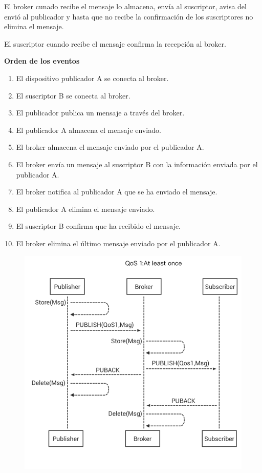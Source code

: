 \documentclass[12pt]{report} %
\begin{document}
\begin{description}
	El broker cunado recibe el mensaje lo almacena, envía al suscriptor, avisa del envió al publicador y hasta que no recibe la confirmación de los suscriptores no elimina el mensaje.

	El suscriptor cuando recibe el mensaje confirma la recepción al broker.

	\textbf{Orden de los eventos}
	\begin{enumerate}
	\item El dispositivo publicador A se conecta al broker.
	\item El suscriptor B se conecta al broker.
	\item El publicador publica un mensaje a través del broker.
	\item El publicador A almacena el mensaje enviado.
	\item El broker almacena el mensaje enviado por el publicador A.
	\item El broker envía un mensaje al suscriptor B con la información enviada por el publicador A.
	\item El broker notifica al publicador A que se ha enviado el mensaje.
	\item El publicador A elimina el mensaje enviado.
	\item El suscriptor B confirma que ha recibido el mensaje.
	\item El broker elimina el último mensaje enviado por el publicador A.
	\end{enumerate}

	\begin{figure}[H]
		{\includegraphics[scale=.35]{0_b4pvXUWp6MVnAAFy.png}}
	\end{figure}


\end{description}
\end{document}
